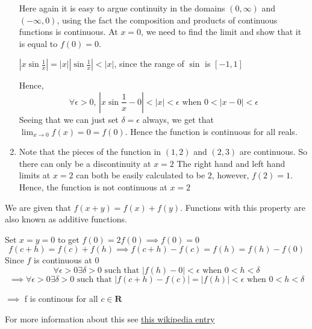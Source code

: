 \documentclass{article}
\begin{document}
\begin{enumerate}
                            Here again it is easy to argue continuity in the domains $(0, \infty)$ and $(-\infty, 0)$, using the fact the composition and products of continuous functions is continuous. At $x=0$, we need to find the limit and show that it is equal to $f(0) = 0$.


                            $|x\sin \frac{1}{x}| = |x||\sin \frac{1}{x}| < |x|$, since the range of $\sin$ is $[-1, 1]$

                            Hence,
                            $$\forall \epsilon>0, \, |x\sin \frac{1}{x} - 0| < |x| < \epsilon  \text{ when } 0 < |x-0| < \epsilon$$
                            Seeing that we can just set $\delta = \epsilon$ always, we get that $\lim_{x \to 0} f(x) = 0 = f(0)$. Hence the function is continuous for all reals.
                    \item Note that the pieces of the function in $(1,2)$ and $(2,3)$ are continuous. So there can only be a discontinuity at $x = 2$
                            The right hand and left hand limits at $x = 2$ can both be easily calculated to be $2$, however, $f(2) = 1$. Hence, the function is not continuous at $x=2$
        \end{enumerate}
\item We are given that $f(x+y) = f(x) + f(y)$. Functions with this property are also known as additive functions.

        Set $x=y=0$ to get $f(0) = 2f(0) \implies f(0) = 0$
$$f(c+h) = f(c) + f(h) \implies f(c+h)-f(c) = f(h) = f(h)-f(0)$$
    Since $f$ is continuous at $0$
    $$ \forall \epsilon>0 \exists \delta>0  \text{ such that }|f(h)-0| < \epsilon  \text{ when } 0 < h < \delta$$
    $$\implies \forall \epsilon>0 \exists \delta>0  \text{ such that } |f(c+h) - f(c)| = |f(h)| < \epsilon\text{ when } 0 < h < \delta$$
    \begin{center}$\implies$ f is continous for all $c \in \mathbf{R}$    

    \end{center}
    For more information about this see \href{https://en.wikipedia.org/wiki/Cauchy\%27s_functional_equation}{this wikipedia entry}
\end{document}
